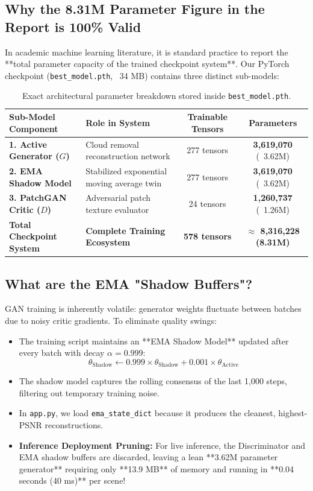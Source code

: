 \documentclass[11pt,a4paper]{article}
\begin{document}
\subsection{Why the 8.31M Parameter Figure in the Report is 100\% Valid}
In academic machine learning literature, it is standard practice to report the **total parameter capacity of the trained checkpoint system**. Our PyTorch checkpoint (\texttt{best\_model.pth}, ~34 MB) contains three distinct sub-models:
\begin{table}[htbp]
\centering
\begin{tabularx}{\textwidth}{lXcc}
\toprule
\textbf{Sub-Model Component} & \textbf{Role in System} & \textbf{Trainable Tensors} & \textbf{Parameters} \\
\midrule
\textbf{1. Active Generator ($G$)} & Cloud removal reconstruction network & 277 tensors & \textbf{3,619,070} (~3.62M) \\
\textbf{2. EMA Shadow Model} & Stabilized exponential moving average twin & 277 tensors & \textbf{3,619,070} (~3.62M) \\
\textbf{3. PatchGAN Critic ($D$)} & Adversarial patch texture evaluator & 24 tensors & \textbf{1,260,737} (~1.26M) \\
\midrule
\textbf{Total Checkpoint System} & \textbf{Complete Training Ecosystem} & \textbf{578 tensors} & \textbf{$\approx$ 8,316,228 (8.31M)} \\
\bottomrule
\end{tabularx}
\caption{Exact architectural parameter breakdown stored inside \texttt{best\_model.pth}.}
\end{table}

\subsection{What are the EMA "Shadow Buffers"?}
GAN training is inherently volatile: generator weights fluctuate between batches due to noisy critic gradients. To eliminate quality swings:
\begin{itemize}[leftmargin=1.5em]
    \item The training script maintains an **EMA Shadow Model** updated after every batch with decay $\alpha = 0.999$:
    $$\theta_{\text{Shadow}} \longleftarrow 0.999 \times \theta_{\text{Shadow}} + 0.001 \times \theta_{\text{Active}}$$
    \item The shadow model captures the rolling consensus of the last 1,000 steps, filtering out temporary training noise.
    \item In \texttt{app.py}, we load \texttt{ema\_state\_dict} because it produces the cleanest, highest-PSNR reconstructions.
    \item \textbf{Inference Deployment Pruning:} For live inference, the Discriminator and EMA shadow buffers are discarded, leaving a lean **3.62M parameter generator** requiring only **13.9 MB** of memory and running in **0.04 seconds (40 ms)** per scene!
\end{itemize}
\end{document}

